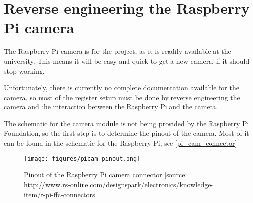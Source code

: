 \section{Reverse engineering the Raspberry Pi camera}\label{pihack}
The Raspberry Pi camera is for the project, as it is readily available at the university. This means it will be easy and quick to get a new camera, if it should stop working.

Unfortunately, there is currently no complete documentation available for the camera, so most of the register setup must be done by reverse engineering the camera and the interaction between the Raspberry Pi and the camera.

The schematic for the camera module is not being provided by the Raspberry Pi Foundation, so the first step is to determine the pinout of the camera. Most of it can be found in the schematic for the Raspberry Pi, see \autoref{pi_cam_connector}

\begin{figure}[H]
	\centering
	\texttt{[image: figures/picam\_pinout.png]}
	\caption{Pinout of the Raspberry Pi camera connector [source: \url{http://www.rs-online.com/designspark/electronics/knowledge-item/r-pi-ffc-connectors}]}
	\label{pi_cam_connector}
\end{figure}

